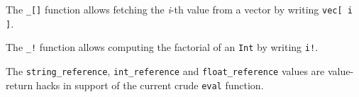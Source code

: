 
The {\tt \_[]} function allows fetching the {\it i}-th value from a vector by writing {\tt vec[ i ]}.

The {\tt \_!} function allows computing the factorial of an {\tt Int} by writing {\tt i!}.

The {\tt string\_reference}, 
 {\tt int\_reference} and 
 {\tt float\_reference} values are value-return hacks in support of the 
current crude {\tt eval} function.

